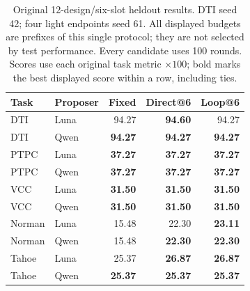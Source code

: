 \begin{table}[htbp]
\caption{Original 12-design/six-slot heldout results. DTI seed 42; four light endpoints seed 61. All displayed budgets are prefixes of this single protocol; they are not selected by test performance. Every candidate uses 100 rounds. Scores use each original task metric $\times100$; bold marks the best displayed score within a row, including ties.}
\label{tab:completed-short6}
\centering\small
\setlength{\tabcolsep}{4pt}
\begin{tabularx}{\linewidth}{@{}Xlrrr@{}}
\toprule
Task & Proposer & Fixed & Direct@6 & Loop@6 \\
\midrule
DTI & Luna & 94.27 & \textbf{94.60} & 94.27 \\
DTI & Qwen & \textbf{94.27} & \textbf{94.27} & \textbf{94.27} \\
PTPC & Luna & \textbf{37.27} & \textbf{37.27} & \textbf{37.27} \\
PTPC & Qwen & \textbf{37.27} & \textbf{37.27} & \textbf{37.27} \\
VCC & Luna & \textbf{31.50} & \textbf{31.50} & \textbf{31.50} \\
VCC & Qwen & \textbf{31.50} & \textbf{31.50} & \textbf{31.50} \\
Norman & Luna & 15.48 & 22.30 & \textbf{23.11} \\
Norman & Qwen & 15.48 & \textbf{22.30} & \textbf{22.30} \\
Tahoe & Luna & 25.37 & \textbf{26.87} & \textbf{26.87} \\
Tahoe & Qwen & \textbf{25.37} & \textbf{25.37} & \textbf{25.37} \\
\bottomrule
\end{tabularx}
\end{table}
